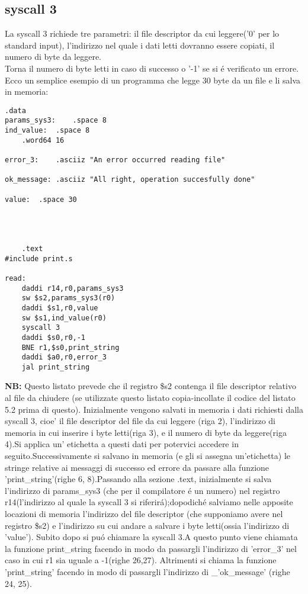 \documentclass[12pt]{report}
\newcommand{\OF}{\textbf{NB:} Questo listato prevede che il registro \$s2 contenga il file descriptor
relativo al file da chiudere (se utilizzate questo listato copia-incollate il codice del listato 5.2 prima di questo).}
\begin{document}
\subsection{syscall 3}
La syscall 3 richiede tre parametri: il file descriptor da cui leggere('0' per lo standard input), 
l’indirizzo nel quale i dati letti dovranno essere copiati, il numero di byte da leggere.\\
Torna il numero di byte letti in caso di successo o '-1' se si \'{e} verificato un errore.\\ 
Ecco un semplice esempio di un programma che legge 30 byte da un file e li salva in memoria:
\begin{lstlisting}[caption={syscall3}, label={code:syscall3}, style={mips}]
      		.data
params_sys3:	.space 8				
ind_value:	.space 8			
	.word64 16		

error_3:	.asciiz "An error occurred reading file"	

ok_message:	.asciiz "All right, operation succesfully done"	

value:	.space 30					

			


	.text
#include print.s	

read:
	daddi r14,r0,params_sys3	
	sw $s2,params_sys3(r0)
	daddi $s1,r0,value			
	sw $s1,ind_value(r0)			
	syscall 3			
	daddi $s0,r0,-1			
	BNE r1,$s0,print_string	
	daddi $a0,r0,error_3
	jal print_string
\end{lstlisting}
\OF{}
Inizialmente vengono salvati in memoria i dati richiesti dalla syscall 3, cioe' il file descriptor del file da cui leggere (riga 2), 
l'indirizzo di memoria in cui inserire i byte letti(riga 3), e il numero di byte da leggere(riga 4).Si applica un' etichetta
 a questi dati per potervici accedere in seguito.Successivamente si salvano in memoria (e gli si assegna un'etichetta) le stringe relative ai messaggi 
di successo ed errore da passare alla funzione 'print_string'(righe 6, 8).Passando alla sezione .text, inizialmente si salva l'indirizzo di params_sys3
(che per il compilatore \'{e} un numero) nel registro r14(l'indirizzo al quale la syscall 3 si riferir\'{a});dopodich\'{e} salviamo nelle apposite locazioni 
di memoria l'indirizzo del file descriptor (che supponiamo avere nel registro \$s2) e l'indirizzo su cui andare a salvare i byte letti(ossia l'indirizzo di 'value').
Subito dopo si pu\'{o} chiamare la syscall 3.A questo  punto viene chiamata la funzione print_string facendo in modo da passargli l'indirizzo di 'error_3'
 nel caso in cui r1 sia uguale a -1(righe 26,27). Altrimenti si chiama la funzione 'print_string' facendo in modo di passargli l'indirizzo di _'ok_message' (righe 24, 25).
\end{document}
